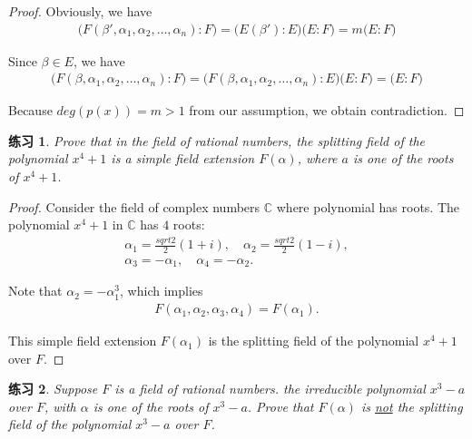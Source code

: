 \documentclass[utf8]{ctexbook}
\newtheorem{exercise}{练习}[section]
\begin{document}
\begin{proof}
Obviously, we have
\begin{align*}
\big( F(\beta', \alpha_1, \alpha_2, \ldots, \alpha_n) : F \big)  = \big( E(\beta') : E \big) \big( E: F \big) = m \big( E:F \big)
\end{align*}

Since $\beta \in E $, we have
\begin{align*}
\big( F(\beta, \alpha_1, \alpha_2, \ldots, \alpha_n) : F\big) = \big( F(\beta, \alpha_1, \alpha_2, \ldots, \alpha_n) : E \big) \big( E : F \big) =  \big( E : F \big)
\end{align*}

Because $deg(p(x)) = m > 1$ from our assumption, we obtain contradiction. 

\end{proof}


\begin{exercise}
Prove that in the field of rational numbers, the splitting field of the polynomial $x^4 + 1 $ is a simple field extension $F(\alpha)$, where $a$ is one of the roots of $x^4 + 1$. 
\end{exercise}

\begin{proof}
Consider the field of complex numbers $\mathbb{C}$ where polynomial has roots. The polynomial $x^4 + 1$ in $\mathbb{C}$ has $4$ roots:
\begin{align*}
\alpha_1 = \frac{sqrt{2}}{2} ( 1 + i), \quad \alpha_2 = \frac{sqrt{2}}{2} ( 1 - i), \\
\alpha_3 = - \alpha_1, \quad \alpha_4 = - \alpha_2 .
\end{align*}

Note that $\alpha_2 = - \alpha_1 ^3$, which implies 
\begin{align*}
F(\alpha_1, \alpha_2, \alpha_3, \alpha_4) = F(\alpha_1).
\end{align*}

This simple field extension $F(\alpha_1)$ is the splitting field of the polynomial $x^4 + 1$ over $F$.
\end{proof}


\begin{exercise}
Suppose $F$ is a field of rational numbers. the irreducible polynomial $x^3 - a$ over $F$, with $\alpha$ is one of the roots of $x^3 - a$. Prove that $F(\alpha)$ is \underline{not} the splitting field of the polynomial $x^3 - a$ over $F$.
\end{exercise}
\end{document}
